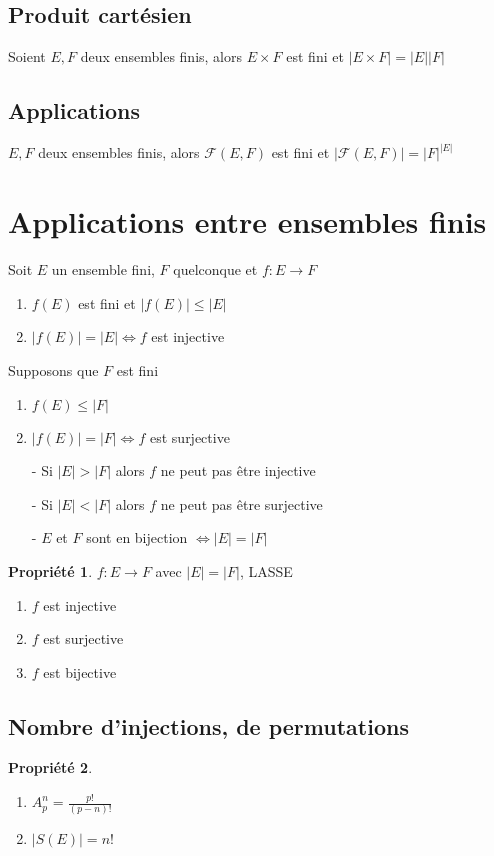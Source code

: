 \documentclass[fleqn]{article}
\theoremstyle{definition} \newtheorem*{defi}{D\'efinition}
\theoremstyle{definition} \newtheorem*{theo}{Th\'eor\`eme}
\theoremstyle{definition} \newtheorem*{coro}{Corollaire}
\theoremstyle{remark} \newtheorem*{rqs}{Remarques}
\theoremstyle{definition} \newtheorem*{prop}{Propri\'et\'e}
\begin{document}
\subsection{Produit cart\'esien}
Soient $E,F$ deux ensembles finis, alors $E\times F$ est fini et $|E\times F| = |E||F|$

\subsection{Applications}
$E,F$ deux ensembles finis, alors $\mathcal{F}(E,F)$ est fini et $|\mathcal{F}(E,F)| = |F|^{|E|}$

\section{Applications entre ensembles finis}
Soit $E$ un ensemble fini, $F$ quelconque et $f: E \rightarrow F$
\begin{enumerate}
	\item $f(E)$ est fini et $|f(E)| \leq |E|$
	\item $|f(E)| = |E| \Leftrightarrow f$ est injective
\end{enumerate}

Supposons que $F$ est fini
\begin{enumerate}
	\item $f(E) \leq |F|$
	\item $|f(E)| = |F| \Leftrightarrow f$ est surjective
\end{enumerate}

\begin{itemize}
	\item [-] Si $|E| > |F|$ alors $f$ ne peut pas \^etre injective
	\item [-] Si $|E| < |F|$ alors $f$ ne peut pas \^etre surjective
	\item [-] $E$ et $F$ sont en bijection $\Leftrightarrow |E| = |F|$
\end{itemize}

\begin{prop} $f: E \rightarrow F$ avec $|E| = |F|$, LASSE
	\begin{enumerate}
		\item $f$ est injective
		\item $f$ est surjective
		\item $f$ est bijective
	\end{enumerate}
\end{prop}

\subsection{Nombre d'injections, de permutations}
\begin{prop} $ $
	\begin{enumerate}
		\item $A_p^n = \frac{p!}{(p-n)!}$
		\item $|S(E)| = n!$
	\end{enumerate}
\end{prop}
\end{document}
